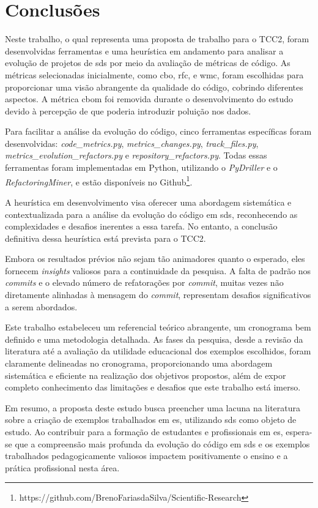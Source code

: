 
\chapter{Conclusões}
\label{cap:conclusoes}

Neste trabalho, o qual representa uma proposta de trabalho para o TCC2, foram desenvolvidas ferramentas e uma heurística em andamento para analisar a evolução de projetos de \gls{sds} por meio da avaliação de métricas de código. As métricas selecionadas inicialmente, como \gls{cbo}, \gls{rfc}, e \gls{wmc}, foram escolhidas para proporcionar uma visão abrangente da qualidade do código, cobrindo diferentes aspectos. A métrica \gls{cbom} foi removida durante o desenvolvimento do estudo devido à percepção de que poderia introduzir poluição nos dados.

Para facilitar a análise da evolução do código, cinco ferramentas específicas foram desenvolvidas: \textit{code\_metrics.py}, \textit{metrics\_changes.py}, \textit{track\_files.py}, \textit{metrics\_evolution\_refactors.py} e \textit{repository\_refactors.py}. Todas essas ferramentas foram implementadas em Python, utilizando o \textit{PyDriller} e o \textit{RefactoringMiner}, e estão disponíveis no Github\footnote{https://github.com/BrenoFariasdaSilva/Scientific-Research}.

A heurística em desenvolvimento visa oferecer uma abordagem sistemática e contextualizada para a análise da evolução do código em \gls{sds}, reconhecendo as complexidades e desafios inerentes a essa tarefa. No entanto, a conclusão definitiva dessa heurística está prevista para o TCC2.

Embora os resultados prévios não sejam tão animadores quanto o esperado, eles fornecem \textit{insights} valiosos para a continuidade da pesquisa. A falta de padrão nos \textit{commits} e o elevado número de refatorações por \textit{commit}, muitas vezes não diretamente alinhadas à mensagem do \textit{commit}, representam desafios significativos a serem abordados.

Este trabalho estabeleceu um referencial teórico abrangente, um cronograma bem definido e uma metodologia detalhada. As fases da pesquisa, desde a revisão da literatura até a avaliação da utilidade educacional dos exemplos escolhidos, foram claramente delineadas no cronograma, proporcionando uma abordagem sistemática e eficiente na realização dos objetivos propostos, além de expor completo conhecimento das limitações e desafios que este trabalho está imerso.

Em resumo, a proposta deste estudo busca preencher uma lacuna na literatura sobre a criação de exemplos trabalhados em \gls{es}, utilizando \gls{sds} como objeto de estudo. Ao contribuir para a formação de estudantes e profissionais em \gls{es}, espera-se que a compreensão mais profunda da evolução do código em \gls{sds} e os exemplos trabalhados pedagogicamente valiosos impactem positivamente o ensino e a prática profissional nesta área.